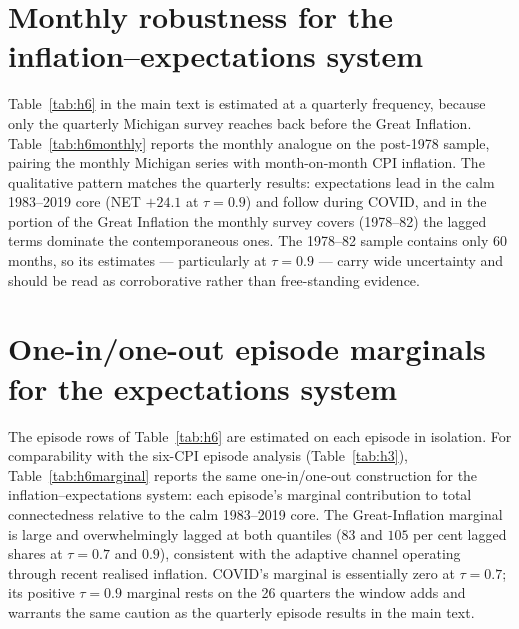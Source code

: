 \documentclass{article}
\begin{document}



\section{Monthly robustness for the inflation--expectations system}\label{app:h6monthly}
Table~\ref{tab:h6} in the main text is estimated at a quarterly frequency, because only the
quarterly Michigan survey reaches back before the Great Inflation. Table~\ref{tab:h6monthly}
reports the monthly analogue on the post-1978 sample, pairing the monthly Michigan series with
month-on-month CPI inflation. The qualitative pattern matches the quarterly results:
expectations lead in the calm 1983--2019 core (NET $+24.1$ at $\tau=0.9$) and follow during
COVID, and in the portion of the Great Inflation the monthly survey covers (1978--82) the
lagged terms dominate the contemporaneous ones. The 1978--82 sample contains only 60 months,
so its estimates --- particularly at $\tau=0.9$ --- carry wide uncertainty and should be read
as corroborative rather than free-standing evidence.



\section{One-in/one-out episode marginals for the expectations system}\label{app:h6marginal}
The episode rows of Table~\ref{tab:h6} are estimated on each episode in isolation. For
comparability with the six-CPI episode analysis (Table~\ref{tab:h3}), Table~\ref{tab:h6marginal}
reports the same one-in/one-out construction for the inflation--expectations system: each
episode's marginal contribution to total connectedness relative to the calm 1983--2019 core.
The Great-Inflation marginal is large and overwhelmingly lagged at both quantiles ($83$ and
$105$ per cent lagged shares at $\tau=0.7$ and $0.9$), consistent with the adaptive channel
operating through recent realised inflation. COVID's marginal is essentially zero at
$\tau=0.7$; its positive $\tau=0.9$ marginal rests on the 26 quarters the window adds and
warrants the same caution as the quarterly episode results in the main text.



\printbibliography
\end{document}
